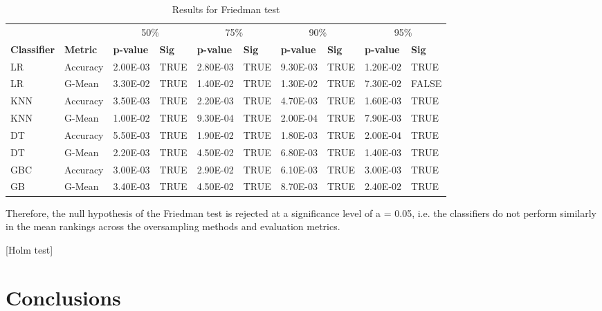 \documentclass[parskip=full]{scrartcl}
\begin{document}
\begin{table}[H]
	\begin{tabular}{ll|ll|ll|ll|ll}
		&          & \multicolumn{2}{c|}{50\%} & \multicolumn{2}{c|}{75\%} & 
		\multicolumn{2}{c|}{90\%} & \multicolumn{2}{c}{95\%} \\
		\textbf{Classifier} & \textbf{Metric}   & \textbf{p-value}  & 
		\textbf{Sig}  & \textbf{p-value}   & 
		\textbf{Sig}  & \textbf{p-value}   & \textbf{Sig}  & 
		\textbf{p-value}   & \textbf{Sig}  
		\\ \hline
		LR         & Accuracy & 2.00E-03  & TRUE          & 2.80E-03  & 
		TRUE          & 9.30E-03  & TRUE          & 1.20E-02  & TRUE          \\
		LR         & G-Mean   & 3.30E-02  & TRUE          & 1.40E-02  & 
		TRUE          & 1.30E-02  & TRUE          & 7.30E-02  & FALSE         \\
		KNN        & Accuracy & 3.50E-03  & TRUE          & 2.20E-03  & 
		TRUE          & 4.70E-03  & TRUE          & 1.60E-03  & TRUE          \\
		KNN        & G-Mean   & 1.00E-02  & TRUE          & 9.30E-04  & 
		TRUE          & 2.00E-04  & TRUE          & 7.90E-03  & TRUE          \\
		DT         & Accuracy & 5.50E-03  & TRUE          & 1.90E-02  & 
		TRUE          & 1.80E-03  & TRUE          & 2.00E-04  & TRUE          \\
		DT         & G-Mean   & 2.20E-03  & TRUE          & 4.50E-02  & 
		TRUE          & 6.80E-03  & TRUE          & 1.40E-03  & TRUE          \\
		GBC        & Accuracy & 3.00E-03  & TRUE          & 2.90E-02  & 
		TRUE          & 6.10E-03  & TRUE          & 3.00E-03  & TRUE          \\
		GB        & G-Mean   & 3.40E-03  & TRUE          & 4.50E-02  & 
		TRUE          & 8.70E-03  & TRUE          & 2.40E-02  & TRUE         
	\end{tabular}
\caption{\label{tab:friedman-test}Results for Friedman test}
\end{table}

Therefore, the null hypothesis of the Friedman test is rejected at a 
significance level of a = 0.05, i.e. the classifiers do not perform similarly 
in the mean rankings across the oversampling methods and evaluation metrics.

[Holm test]

\section{Conclusions}
\end{document}
